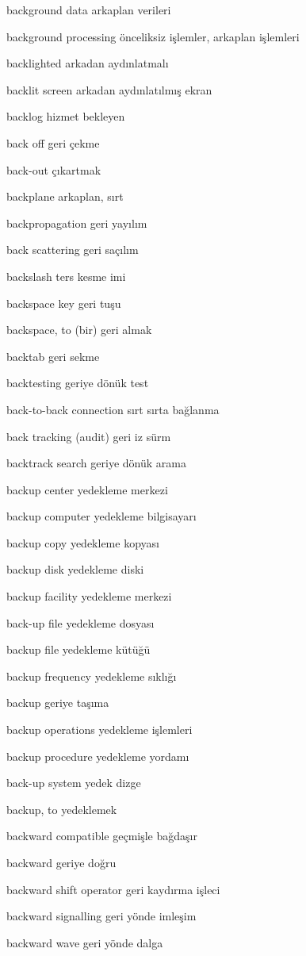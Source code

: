 \documentclass[12pt,fleqn]{article}\usepackage{../../common}
\begin{document}
background data arkaplan verileri

background processing önceliksiz işlemler, arkaplan işlemleri

backlighted arkadan aydınlatmalı

backlit screen arkadan aydınlatılmış ekran

backlog hizmet bekleyen

back off geri çekme

back-out çıkartmak

backplane arkaplan, sırt

backpropagation geri yayılım

back scattering geri saçılım

backslash ters kesme imi

backspace key geri tuşu

backspace, to (bir) geri almak

backtab geri sekme

backtesting geriye dönük test

back-to-back connection sırt sırta bağlanma

back tracking (audit) geri iz sürm

backtrack search geriye dönük arama

backup center yedekleme merkezi

backup computer yedekleme bilgisayarı

backup copy yedekleme kopyası

backup disk yedekleme diski

backup facility yedekleme merkezi

back-up file yedekleme dosyası

backup file yedekleme kütüğü

backup frequency yedekleme sıklığı

backup geriye taşıma

backup operations yedekleme işlemleri

backup procedure yedekleme yordamı

back-up system yedek dizge

backup, to yedeklemek

backward compatible geçmişle bağdaşır

backward geriye doğru

backward shift operator geri kaydırma işleci

backward signalling geri yönde imleşim

backward wave geri yönde dalga
\end{document}
